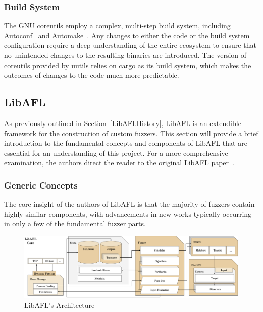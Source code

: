\documentclass{article}
\let\savedCite=\cite
\renewcommand{\cite}{\unskip~\savedCite}
\begin{document}
\begin{multicols}{2}
    \subsubsection{Build System}
    \label{CoreutilsBuildSystem}

    The GNU coreutils employ a complex, multi-step build system, including Autoconf\cite{Autoconf} and Automake\cite{Automake}. Any changes to either the code or the build system configuration require a deep understanding of the entire ecosystem to ensure that no unintended changes to the resulting binaries are introduced. The version of coreutils provided by uutils relies on cargo as its build system, which makes the outcomes of changes to the code much more predictable.

    \subsection{LibAFL}
    \label{LibAFLBackground}
    As previously outlined in Section~\ref{LibAFLHistory}, LibAFL is an extendible framework for the construction of custom fuzzers. This section will provide a brief introduction to the fundamental concepts and components of LibAFL that are essential for an understanding of this project. For a more comprehensive examination, the authors direct the reader to the original LibAFL paper\cite{LibAFL}.

    \subsubsection{Generic Concepts}
    The core insight of the authors of LibAFL is that the majority of fuzzers contain highly similar components, with advancements in new works typically occurring in only a few of the fundamental fuzzer parts.

\end{multicols}
\vspace{1em}
\begin{figure}[b]
    \centering
    \includegraphics[width=\textwidth]{assets/LibAFLArchitecture.png}
    \caption{LibAFL's Architecture\cite{LibAFL}}
    \label{fig:LibAFLArchitecture}
\end{figure}
\end{document}
